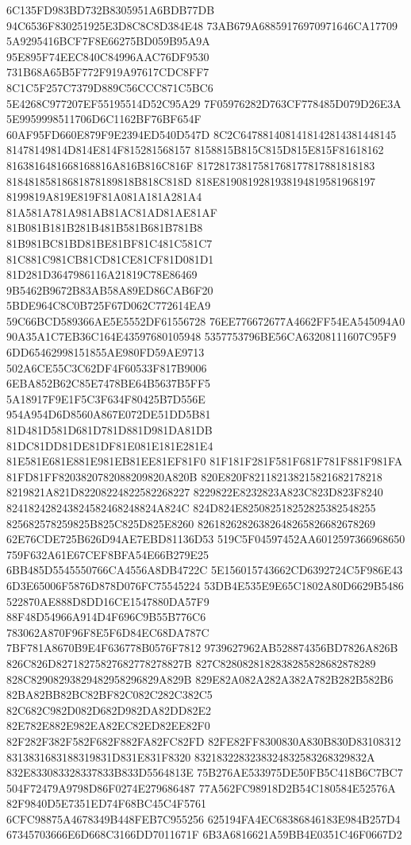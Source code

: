 6C135FD983BD732B8305951A6BDB77DB
94C6536F830251925E3D8C8C8D384E48
73AB679A68859176970971646CA17709
5A9295416BCF7F8E66275BD059B95A9A
95E895F74EEC840C84996AAC76DF9530
731B68A65B5F772F919A97617CDC8FF7
8C1C5F257C7379D889C56CCC871C5BC6
5E4268C977207EF55195514D52C95A29
7F05976282D763CF778485D079D26E3A
5E9959998511706D6C1162BF76BF654F
60AF95FD660E879F9E2394ED540D547D
8C2C6478814081418142814381448145
81478149814D814E814F815281568157
8158815B815C815D815E815F81618162
8163816481668168816A816B816C816F
81728173817581768177817881818183
81848185818681878189818B818C818D
818E8190819281938194819581968197
8199819A819E819F81A081A181A281A4
81A581A781A981AB81AC81AD81AE81AF
81B081B181B281B481B581B681B781B8
81B981BC81BD81BE81BF81C481C581C7
81C881C981CB81CD81CE81CF81D081D1
81D281D3647986116A21819C78E86469
9B5462B9672B83AB58A89ED86CAB6F20
5BDE964C8C0B725F67D062C772614EA9
59C66BCD589366AE5E5552DF61556728
76EE776672677A4662FF54EA545094A0
90A35A1C7EB36C164E43597680105948
5357753796BE56CA63208111607C95F9
6DD65462998151855AE980FD59AE9713
502A6CE55C3C62DF4F60533F817B9006
6EBA852B62C85E7478BE64B5637B5FF5
5A18917F9E1F5C3F634F80425B7D556E
954A954D6D8560A867E072DE51DD5B81
81D481D581D681D781D881D981DA81DB
81DC81DD81DE81DF81E081E181E281E4
81E581E681E881E981EB81EE81EF81F0
81F181F281F581F681F781F881F981FA
81FD81FF8203820782088209820A820B
820E820F821182138215821682178218
8219821A821D82208224822582268227
8229822E8232823A823C823D823F8240
824182428243824582468248824A824C
824D824E825082518252825382548255
825682578259825B825C825D825E8260
82618262826382648265826682678269
62E76CDE725B626D94AE7EBD81136D53
519C5F04597452AA6012597366968650
759F632A61E67CEF8BFA54E66B279E25
6BB485D5545550766CA4556A8DB4722C
5E156015743662CD6392724C5F986E43
6D3E65006F5876D878D076FC75545224
53DB4E535E9E65C1802A80D6629B5486
522870AE888D8DD16CE1547880DA57F9
88F48D54966A914D4F696C9B55B776C6
783062A870F96F8E5F6D84EC68DA787C
7BF781A8670B9E4F636778B0576F7812
9739627962AB528874356BD7826A826B
826C826D82718275827682778278827B
827C8280828182838285828682878289
828C82908293829482958296829A829B
829E82A082A282A382A782B282B582B6
82BA82BB82BC82BF82C082C282C382C5
82C682C982D082D682D982DA82DD82E2
82E782E882E982EA82EC82ED82EE82F0
82F282F382F582F682F882FA82FC82FD
82FE82FF8300830A830B830D83108312
8313831683188319831D831E831F8320
8321832283238324832583268329832A
832E833083328337833B833D5564813E
75B276AE533975DE50FB5C418B6C7BC7
504F72479A9798D86F0274E279686487
77A562FC98918D2B54C180584E52576A
82F9840D5E7351ED74F68BC45C4F5761
6CFC98875A4678349B448FEB7C955256
625194FA4EC68386846183E984B257D4
67345703666E6D668C3166DD7011671F
6B3A6816621A59BB4E0351C46F0667D2
